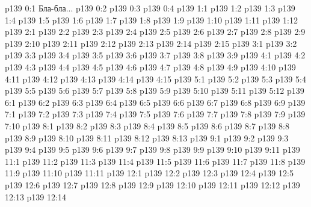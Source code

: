 \author{Промежуточные создания}
\vs p139 0:1  Бла-бла...
\vs p139 0:2 
\vs p139 0:3 \pc 
\vs p139 0:4 
\vs p139 1:1 
\vs p139 1:2 
\vs p139 1:3 \pc 
\vs p139 1:4 
\vs p139 1:5 
\vs p139 1:6 \pc 
\vs p139 1:7 
\vs p139 1:8 \pc 
\vs p139 1:9 
\vs p139 1:10 
\vs p139 1:11 \pc 
\vs p139 1:12 \pc 
{}
\vs p139 2:1 
\vs p139 2:2 
\vs p139 2:3 \pc 
\vs p139 2:4 
\vs p139 2:5 \pc 
\vs p139 2:6 \pc 
\vs p139 2:7 
\vs p139 2:8 
\vs p139 2:9 
\vs p139 2:10 
\vs p139 2:11 \pc 
\vs p139 2:12 \pc 
\vs p139 2:13 
\vs p139 2:14 \pc 
\vs p139 2:15 \pc 
{}
\vs p139 3:1 
\vs p139 3:2 \pc 
\vs p139 3:3 
\vs p139 3:4 
\vs p139 3:5 
\vs p139 3:6 \pc 
\vs p139 3:7 \pc 
\vs p139 3:8 
\vs p139 3:9 \pc 
{}
\vs p139 4:1 
\vs p139 4:2 
\vs p139 4:3 \pc 
\vs p139 4:4 \pc 
\vs p139 4:5 
\vs p139 4:6 \pc 
\vs p139 4:7 \pc 
\vs p139 4:8 \pc 
\vs p139 4:9 
\vs p139 4:10 
\vs p139 4:11 
\vs p139 4:12 
\vs p139 4:13 
\vs p139 4:14 
\vs p139 4:15 
\vs p139 5:1 
\vs p139 5:2 
\vs p139 5:3 \pc 
\vs p139 5:4 
\vs p139 5:5 
\vs p139 5:6 
\vs p139 5:7 \pc 
\vs p139 5:8 
\vs p139 5:9 
\vs p139 5:10 
\vs p139 5:11 \pc 
\vs p139 5:12 \pc 
{}
\vs p139 6:1 
\vs p139 6:2 
\vs p139 6:3 \pc 
\vs p139 6:4 
\vs p139 6:5 
\vs p139 6:6 
\vs p139 6:7 
\vs p139 6:8 \pc 
\vs p139 6:9 \pc 
{}
\vs p139 7:1 
\vs p139 7:2 \pc 
\vs p139 7:3 
\vs p139 7:4 
\vs p139 7:5 \pc 
\vs p139 7:6 
\vs p139 7:7 
\vs p139 7:8 \pc 
\vs p139 7:9 
\vs p139 7:10 \pc 
{}
\vs p139 8:1 
\vs p139 8:2 
\vs p139 8:3 
\vs p139 8:4 
\vs p139 8:5 
\vs p139 8:6 
\vs p139 8:7 \pc 
\vs p139 8:8 \pc 
\vs p139 8:9 
\vs p139 8:10 \pc 
\vs p139 8:11 
\vs p139 8:12 
\vs p139 8:13 \pc 
{}
\vs p139 9:1 
\vs p139 9:2 \pc 
\vs p139 9:3 
\vs p139 9:4 
\vs p139 9:5 
\vs p139 9:6 \pc 
\vs p139 9:7 
\vs p139 9:8 \pc 
\vs p139 9:9 
\vs p139 9:10 
\vs p139 9:11 \pc 
{}
\vs p139 11:1 
\vs p139 11:2 \pc 
\vs p139 11:3 
\vs p139 11:4 
\vs p139 11:5 \pc 
\vs p139 11:6 \pc 
\vs p139 11:7 
\vs p139 11:8 \pc 
\vs p139 11:9 \pc 
\vs p139 11:10 \pc 
\vs p139 11:11 
\vs p139 12:1 
\vs p139 12:2 \pc 
\vs p139 12:3 
\vs p139 12:4 \pc 
\vs p139 12:5 \pc 
\vs p139 12:6 
\vs p139 12:7 \pc 
\vs p139 12:8 
\vs p139 12:9 \pc 
\vs p139 12:10 
\vs p139 12:11 
\vs p139 12:12 
\vs p139 12:13 
\vs p139 12:14 
\quizlink
